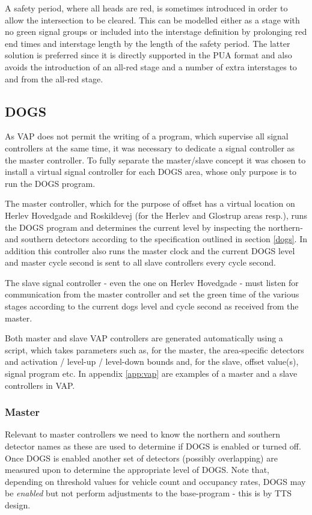 A safety period, where all heads are red, is sometimes introduced in order to allow the intersection to be cleared. This can be modelled either as a stage with no green signal groups or included into the interstage definition by prolonging red end times and interstage length by the length of the safety period. The latter solution is preferred since it is directly supported in the PUA format and also avoids the introduction of an all-red stage and a number of extra interstages to and from the all-red stage.

\subsection{DOGS}
As VAP does not permit the writing of a program, which supervise all signal controllers at the same time, it was necessary to dedicate a signal controller as the master controller. To fully separate the master/slave concept it was chosen to install a virtual signal controller for each DOGS area, whose only purpose is to run the DOGS program.

The master controller, which for the purpose of offset has a virtual location on Herlev Hovedgade and Roskildevej (for the Herlev and Glostrup areas resp.), runs the DOGS program and determines the current level by inspecting the northern- and southern detectors according to the specification outlined in section \ref{dogs}. In addition this controller also runs the master clock and the current DOGS level and master cycle second is sent to all slave controllers every cycle second.

The slave signal controller - even the one on Herlev Hovedgade - must listen for communication from the master controller and set the green time of the various stages according to the current dogs level and cycle second as received from the master.

Both master and slave VAP controllers are generated automatically using a script, which takes parameters such as, for the master, the area-specific detectors and activation / level-up / level-down bounds and, for the slave, offset value(s), signal program etc. In appendix \ref{app:vap} are examples of a master and a slave controllers in VAP.

\subsubsection{Master}
Relevant to master controllers we need to know the northern and southern detector names as these are used to determine if DOGS is enabled or turned off. Once DOGS is enabled another set of detectors (possibly overlapping) are measured upon to determine the appropriate level of DOGS. Note that, depending on threshold values for vehicle count and occupancy rates, DOGS may be \textit{enabled} but not perform adjustments to the base-program - this is by TTS design.

